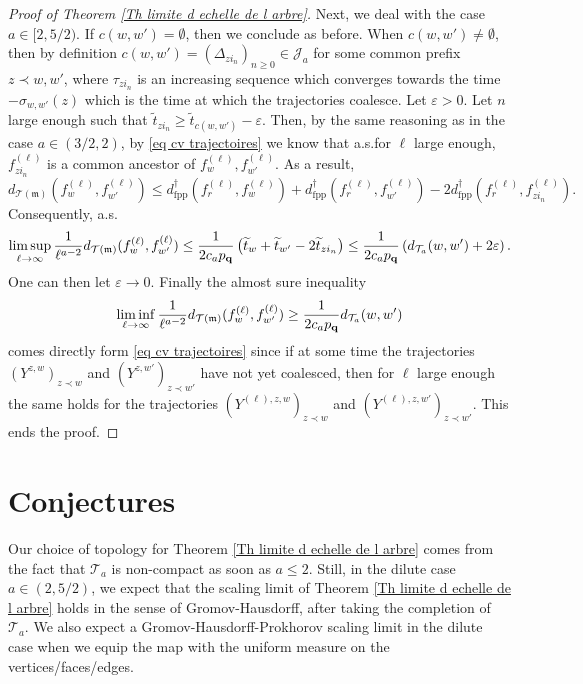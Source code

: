 \documentclass[11pt]{article}
\numberwithin{equation}{section}
\def\vp{\varepsilon}
\def \T{\mathcal{T}}
\begin{document}
\begin{proof}[Proof of Theorem \ref{Th limite d echelle de l arbre}]
Next, we deal with the case $a \in [2,5/2)$. If $c(w,w')=\emptyset$, then we conclude as before. When $c(w,w') \neq \emptyset$, then by definition $c(w,w') = (\Delta_{zi_n})_{n\ge 0}\in \mathcal{J}_a$ for some common prefix $z\prec w,w'$, where $\tau_{zi_n} $ is an increasing sequence which converges towards the time $-\sigma_{w,w'}(z)$ which is the time at which the trajectories coalesce. Let $\vp>0$. Let $n$ large enough such that $\widetilde{t}_{zi_n} \ge \widetilde{t}_{c(w,w')}-\vp$. Then, by the same reasoning as in the case $a\in (3/2,2)$, by \eqref{eq cv trajectoires} we know that a.s.\@ for $\ell$ large enough, $f^{(\ell)}_{zi_n}$ is a common ancestor of $f^{(\ell)}_w,f^{(\ell)}_{w'}$. As a result,
$$
d_{\T(\mathfrak{m})} (f^{(\ell)}_w,f^{(\ell)}_{w'}) \le d^\dagger_{\mathrm{fpp}}(f^{(\ell)}_r,f^{(\ell)}_w)+ d^\dagger_{\mathrm{fpp}}(f^{(\ell)}_r,f^{(\ell)}_{w'})- 2d^\dagger_{\mathrm{fpp}}(f^{(\ell)}_r,f^{(\ell)}_{zi_n}).
$$
Consequently, a.s.
$$
\limsup_{\ell \to \infty} \frac{1}{\ell^{a-2}}d_{\T(\mathfrak{m})} (f^{(\ell)}_w, f^{(\ell)}_{w'})
\le
\frac{1}{2c_a p_{\bf q}}\left(\widetilde{t}_w + \widetilde{t}_{w'}- 2 \widetilde{t}_{zi_n}
 \right)
 \le \frac{1}{2 c_a p_{\bf q}} \left( d_{\T_a}(w,w') +2 \vp \right).
$$
One can then let $\vp \to 0$. Finally the almost sure inequality
$$
\liminf_{\ell \to \infty} \frac{1}{\ell^{a-2}} d_{\T(\mathfrak{m})} (f^{(\ell)}_w, f^{(\ell)}_{w'})\ge \frac{1}{2c_a p_{\bf q}} d_{\T_a}(w,w')
$$
comes directly form \eqref{eq cv trajectoires} since if at some time the trajectories $(Y^{z,w})_{z \prec w}$ and $(Y^{z,w'})_{z\prec w'}$ have not yet coalesced, then for $\ell$ large enough the same holds for the trajectories $(Y^{(\ell),z,w})_{z \prec w}$ and $(Y^{(\ell),z,w'})_{z\prec w'}$. This ends the proof.
\end{proof}


\section{Conjectures}\label{section conjectures}

Our choice of topology for Theorem \ref{Th limite d echelle de l arbre} comes from the fact that $\T_a$ is non-compact as soon as $a \le 2$. Still, in the dilute case $a \in (2, 5/2)$, we expect that the scaling limit of Theorem \ref{Th limite d echelle de l arbre} holds in the sense of Gromov-Hausdorff, after taking the completion of $\T_a$. We also expect a Gromov-Hausdorff-Prokhorov scaling limit in the dilute case when we equip the map with the uniform measure on the vertices/faces/edges.
\end{document}
